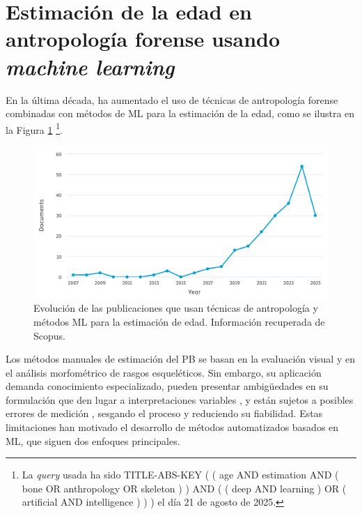 
\section{Estimación de la edad en antropología forense usando \textit{machine learning}}

En la última década, ha aumentado el uso de técnicas de antropología forense combinadas con métodos de \acrshort{ML} para la estimación de la edad, como se ilustra en la Figura \ref{fig:num_papers_2}%
\footnote{
    La \textit{query} usada ha sido
    TITLE-ABS-KEY ( ( age AND estimation AND ( bone OR anthropology OR skeleton ) ) AND ( ( deep AND learning ) OR ( artificial AND intelligence ) ) )
    el día 21 de agosto de 2025.
}.

\begin{figure}[h]
    \centering
    \includegraphics[width=\textwidth]{capitulos/cap_03/imagenes/num_papers_2.png}
    \caption[
        Evolución de las publicaciones que usan técnicas de antropología y métodos ML para la estimación de edad. 
    ]{
        Evolución de las publicaciones que usan técnicas de antropología y métodos ML para la estimación de edad. 
        Información recuperada de Scopus.
    }
    \label{fig:num_papers_2}
\end{figure}

Los métodos manuales de estimación del \acrshort{PB} se basan en la evaluación visual y en el análisis morfométrico de rasgos esqueléticos. Sin embargo, su aplicación demanda conocimiento especializado, pueden presentar ambigüedades en su formulación que den lugar a interpretaciones variables \cite{berst2001}, y están sujetos a posibles errores de medición \cite{langley2018}, sesgando el proceso y reduciendo su fiabilidad. Estas limitaciones han motivado el desarrollo de métodos automatizados basados en \acrshort{ML}, que siguen dos enfoques principales. 

